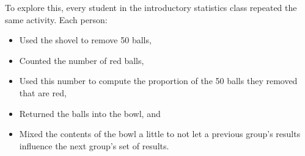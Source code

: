 \documentclass[
  letterpaper,
  DIV=11,
  numbers=noendperiod]{scrreprt}
\providecommand{\tightlist}{%
  \setlength{\itemsep}{0pt}\setlength{\parskip}{0pt}}\usepackage{longtable,booktabs,array}
\theoremstyle{definition}
\theoremstyle{remark}
\begin{document}
To explore this, every student in the introductory statistics class
repeated the same activity. Each person:

\begin{itemize}
\tightlist
\item
  Used the shovel to remove 50 balls,
\item
  Counted the number of red balls,
\item
  Used this number to compute the proportion of the 50 balls they
  removed that are red,
\item
  Returned the balls into the bowl, and
\item
  Mixed the contents of the bowl a little to not let a previous group's
  results influence the next group's set of results.
\end{itemize}
\end{document}

